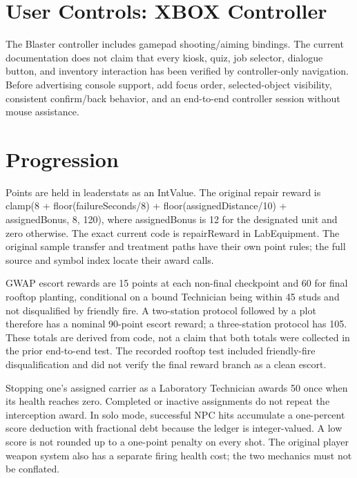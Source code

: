 \section{User Controls: XBOX Controller}
The Blaster controller includes gamepad shooting/\allowbreak{}aiming bindings.\allowbreak{} The current documentation does not claim that every kiosk, quiz, job selector, dialogue button, and inventory interaction has been verified by controller-only navigation.\allowbreak{} Before advertising console support, add focus order, selected-object visibility, consistent confirm/\allowbreak{}back behavior, and an end-to-end controller session without mouse assistance.\allowbreak{}

\section{Progression}
Points are held in leaderstats as an IntValue.\allowbreak{} The original repair reward is clamp(8 + floor(failureSeconds/\allowbreak{}8) + floor(assignedDistance/\allowbreak{}10) + assignedBonus, 8, 120), where assignedBonus is 12 for the designated unit and zero otherwise.\allowbreak{} The exact current code is repairReward in LabEquipment.\allowbreak{} The original sample transfer and treatment paths have their own point rules; the full source and symbol index locate their award calls.\allowbreak{}

GWAP escort rewards are 15 points at each non-final checkpoint and 60 for final rooftop planting, conditional on a bound Technician being within 45 studs and not disqualified by friendly fire.\allowbreak{} A two-station protocol followed by a plot therefore has a nominal 90-point escort reward; a three-station protocol has 105.\allowbreak{} These totals are derived from code, not a claim that both totals were collected in the prior end-to-end test.\allowbreak{} The recorded rooftop test included friendly-fire disqualification and did not verify the final reward branch as a clean escort.\allowbreak{}

Stopping one's assigned carrier as a Laboratory Technician awards 50 once when its health reaches zero.\allowbreak{} Completed or inactive assignments do not repeat the interception award.\allowbreak{} In solo mode, successful NPC hits accumulate a one-percent score deduction with fractional debt because the ledger is integer-valued.\allowbreak{} A low score is not rounded up to a one-point penalty on every shot.\allowbreak{} The original player weapon system also has a separate firing health cost; the two mechanics must not be conflated.\allowbreak{}

